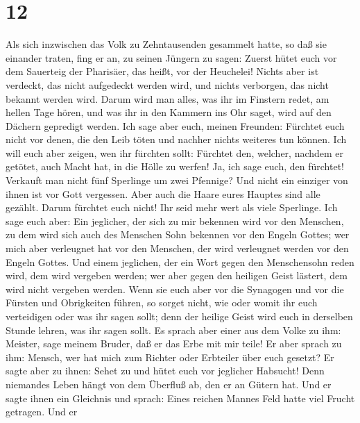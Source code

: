 \hypertarget{section-11}{%
\section{12}\label{section-11}}

 Als sich inzwischen das Volk zu Zehntausenden gesammelt
hatte, so daß sie einander traten, fing er an, zu seinen Jüngern zu
sagen: Zuerst hütet euch vor dem Sauerteig der Pharisäer, das heißt, vor
der Heuchelei!  Nichts aber ist verdeckt, das nicht
aufgedeckt werden wird, und nichts verborgen, das nicht bekannt werden
wird.  Darum wird man alles, was ihr im Finstern redet, am
hellen Tage hören, und was ihr in den Kammern ins Ohr saget, wird auf
den Dächern gepredigt werden.  Ich sage aber euch, meinen
Freunden: Fürchtet euch nicht vor denen, die den Leib töten und nachher
nichts weiteres tun können.  Ich will euch aber zeigen,
wen ihr fürchten sollt: Fürchtet den, welcher, nachdem er getötet, auch
Macht hat, in die Hölle zu werfen! Ja, ich sage euch, den fürchtet!
 Verkauft man nicht fünf Sperlinge um zwei Pfennige? Und
nicht ein einziger von ihnen ist vor Gott vergessen.  Aber
auch die Haare eures Hauptes sind alle gezählt. Darum fürchtet euch
nicht! Ihr seid mehr wert als viele Sperlinge.  Ich sage
euch aber: Ein jeglicher, der sich zu mir bekennen wird vor den
Menschen, zu dem wird sich auch des Menschen Sohn bekennen vor den
Engeln Gottes;  wer mich aber verleugnet hat vor den
Menschen, der wird verleugnet werden vor den Engeln Gottes.
 Und einem jeglichen, der ein Wort gegen den Menschensohn
reden wird, dem wird vergeben werden; wer aber gegen den heiligen Geist
lästert, dem wird nicht vergeben werden.  Wenn sie euch
aber vor die Synagogen und vor die Fürsten und Obrigkeiten führen, so
sorget nicht, wie oder womit ihr euch verteidigen oder was ihr sagen
sollt;  denn der heilige Geist wird euch in derselben
Stunde lehren, was ihr sagen sollt.  Es sprach aber einer
aus dem Volke zu ihm: Meister, sage meinem Bruder, daß er das Erbe mit
mir teile!  Er aber sprach zu ihm: Mensch, wer hat mich
zum Richter oder Erbteiler über euch gesetzt?  Er sagte
aber zu ihnen: Sehet zu und hütet euch vor jeglicher Habsucht! Denn
niemandes Leben hängt von dem Überfluß ab, den er an Gütern hat.
 Und er sagte ihnen ein Gleichnis und sprach: Eines
reichen Mannes Feld hatte viel Frucht getragen.  Und er
